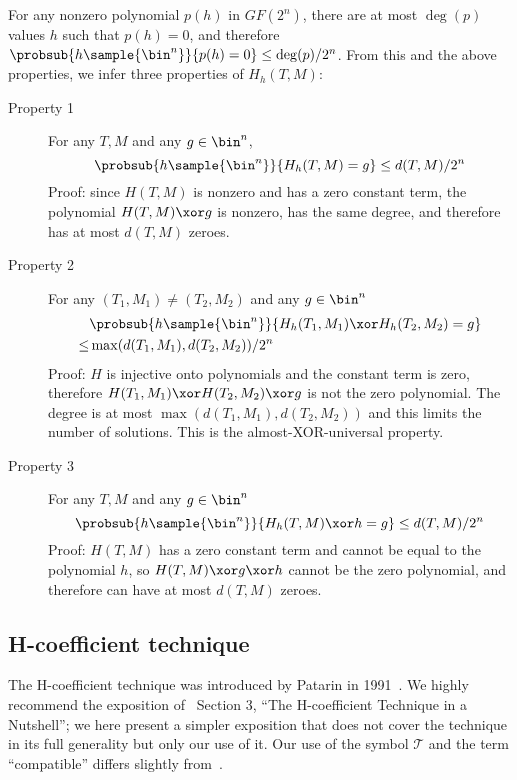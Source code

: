 \documentclass[hctr.tex]{subfiles}
\begin{document}
For any nonzero polynomial \(p(h)\)
in \(GF(2^n)\), there are at most \(\deg(p)\) values \(h\)
such that \(p(h) = 0\), and therefore
\(\probsub{h\sample{\bin^n}}{p(h) = 0} \leq \deg(p)/2^n\).
From this and the above properties,
we infer three properties of \(H_h(T, M)\):
\begin{description}
    \item[Property 1]
    For any \(T, M\) and any \(g \in \bin^n\),
    \begin{displaymath}
        \probsub{h\sample{\bin^n}}{H_h(T, M) = g} \leq d(T, M)/2^n
    \end{displaymath}
    Proof: since \(H(T, M)\) is nonzero and has
    a zero constant term,
    the polynomial \(H(T, M) \xor g\) 
    is nonzero,
    has the same degree,
    and therefore has at most \(d(T, M)\) zeroes.
    \item[Property 2] 
    For any \((T_1, M_1) \neq (T_2, M_2)\) and any \(g \in \bin^n\)
    \begin{align*}
        & \probsub{h\sample{\bin^n}}{H_h(T_1, M_1) \xor H_h(T_2, M_2) = g} \\
        \leq  & \max(d(T_1, M_1), d(T_2, M_2))/2^n
    \end{align*}
    Proof: \(H\) is injective onto polynomials
    and the constant term is zero, therefore
    \(H(T_1, M_1) \xor H(T_2, M_2) \xor g\)
    is not the zero polynomial.
    The degree is at most \(\max(d(T_1, M_1), d(T_2, M_2))\)
    and this limits the number of solutions.
    This is the almost-XOR-universal property.
    \item[Property 3]
    For any \(T, M\) and any \(g \in \bin^n\)
    \begin{displaymath}
        \probsub{h\sample{\bin^n}}{H_h(T, M) \xor h = g} \leq d(T, M)/2^n
    \end{displaymath}
    Proof: \(H(T, M)\) has a zero constant term and
    cannot be equal to the polynomial \(h\),
    so \(H(T, M) \xor g \xor h\) cannot be the zero polynomial, and
    therefore can have at most \(d(T, M)\) zeroes.
\end{description}

\subsection{H-coefficient technique}
The H-coefficient technique was introduced by Patarin in 1991~\cite{ppdes,hco}.
We highly recommend the exposition
of~\cite{hco2} Section 3,
``The H-coefficient Technique in a Nutshell'';
we here present a simpler exposition that
does not cover the technique in its full
generality but only our use of it.
Our use of the symbol \(\mathcal{T}\) and the term
``compatible'' differs slightly from~\cite{hco2}.
\end{document}
